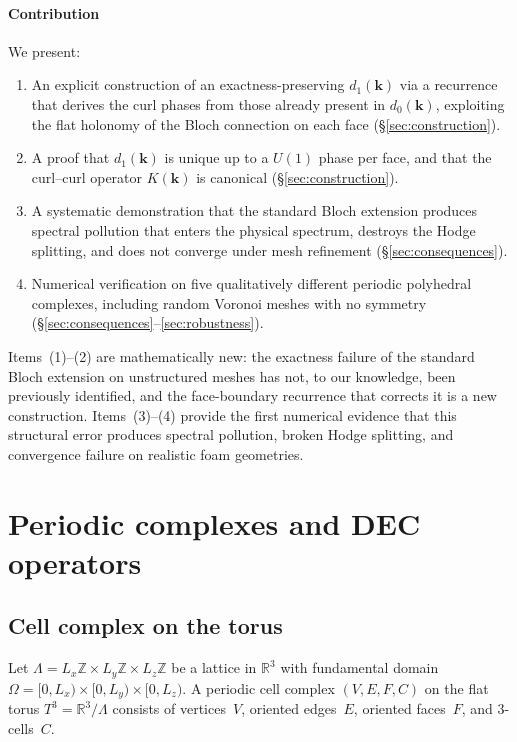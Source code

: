 \documentclass[preprint,12pt]{elsarticle}
\begin{document}
\paragraph{Contribution} We present:
\begin{enumerate}
  \item An explicit construction of an exactness-preserving $d_1(\mathbf{k})$ via a recurrence that derives the curl phases from those already present in $d_0(\mathbf{k})$, exploiting the flat holonomy of the Bloch connection on each face (\S\ref{sec:construction}).
  \item A proof that $d_1(\mathbf{k})$ is unique up to a $U(1)$ phase per face, and that the curl--curl operator $K(\mathbf{k})$ is canonical (\S\ref{sec:construction}).
  \item A systematic demonstration that the standard Bloch extension produces spectral pollution that enters the physical spectrum, destroys the Hodge splitting, and does not converge under mesh refinement (\S\ref{sec:consequences}).
  \item Numerical verification on five qualitatively different periodic polyhedral complexes, including random Voronoi meshes with no symmetry (\S\ref{sec:consequences}--\ref{sec:robustness}).
\end{enumerate}
Items~(1)--(2) are mathematically new: the exactness failure of the standard Bloch extension on unstructured meshes has not, to our knowledge, been previously identified, and the face-boundary recurrence that corrects it is a new construction. Items~(3)--(4) provide the first numerical evidence that this structural error produces spectral pollution, broken Hodge splitting, and convergence failure on realistic foam geometries.

\section{Periodic complexes and DEC operators}
\label{sec:setup}

\subsection{Cell complex on the torus}

Let $\Lambda = L_x\mathbb{Z} \times L_y\mathbb{Z} \times L_z\mathbb{Z}$ be a lattice in $\mathbb{R}^3$ with fundamental domain $\Omega = [0,L_x) \times [0,L_y) \times [0,L_z)$. A periodic cell complex $(V, E, F, C)$ on the flat torus $T^3 = \mathbb{R}^3/\Lambda$ consists of vertices~$V$, oriented edges~$E$, oriented faces~$F$, and 3-cells~$C$.
\end{document}
